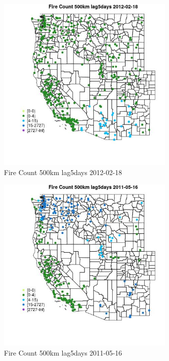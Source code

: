 \begin{figure} 
\centering  
\includegraphics[width=0.77\textwidth]{Code_Outputs/Report_ML_input_PM25_Step4_part_f_de_duplicated_aves_prioritize_24hr_obswNAs_MapObsFire_Count_500km_lag5days2012-02-18.jpg} 
\caption{\label{fig:Report_ML_input_PM25_Step4_part_f_de_duplicated_aves_prioritize_24hr_obswNAsMapObsFire_Count_500km_lag5days2012-02-18}Fire Count 500km lag5days 2012-02-18} 
\end{figure} 
 

\begin{figure} 
\centering  
\includegraphics[width=0.77\textwidth]{Code_Outputs/Report_ML_input_PM25_Step4_part_f_de_duplicated_aves_prioritize_24hr_obswNAs_MapObsFire_Count_500km_lag5days2011-05-16.jpg} 
\caption{\label{fig:Report_ML_input_PM25_Step4_part_f_de_duplicated_aves_prioritize_24hr_obswNAsMapObsFire_Count_500km_lag5days2011-05-16}Fire Count 500km lag5days 2011-05-16} 
\end{figure} 
 

